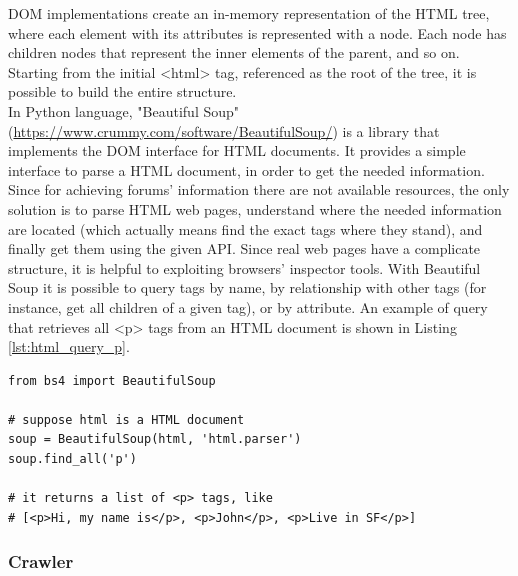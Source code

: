 \ac{DOM} implementations create an in-memory representation of the \ac{HTML} tree, where each element with its attributes is represented with a node. Each node has children nodes that represent the inner elements of the parent, and so on. Starting from the initial <html> tag, referenced as the root of the tree, it is possible to build the entire structure.\\

In Python language, "Beautiful Soup" (\url{https://www.crummy.com/software/BeautifulSoup/}) is a library that implements the \ac{DOM} interface for \ac{HTML} documents. It provides a simple interface to parse a \ac{HTML} document, in order to get the needed information. Since for achieving forums' information there are not available resources, the only solution is to parse \ac{HTML} web pages, understand where the needed information are located (which actually means find the exact tags where they stand), and finally get them using the given \ac{API}. Since real web pages have a complicate structure, it is helpful to exploiting browsers'  inspector tools. With Beautiful Soup it is possible to query tags by name, by relationship with other tags (for instance, get all children of a given tag), or by attribute. An example of query that retrieves all <p> tags from an \ac{HTML} document is shown in Listing \ref{lst:html_query_p}.

\lstset{language=Python}
\lstset{frame=lines}
\lstset{basicstyle=\footnotesize}
\begin{lstlisting}
from bs4 import BeautifulSoup

# suppose html is a HTML document
soup = BeautifulSoup(html, 'html.parser')
soup.find_all('p')

# it returns a list of <p> tags, like
# [<p>Hi, my name is</p>, <p>John</p>, <p>Live in SF</p>]
\end{lstlisting}



\subsubsection{Crawler}

